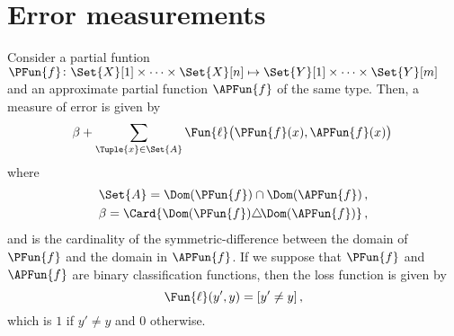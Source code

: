\documentclass[ ../main.tex]{subfiles}
\newcommand{\Loss}{\Fun{\ell}}
\begin{document}
\appendix
\section{Error measurements}
\label{sec:error}
Consider a partial funtion $\PFun{f} \colon \Set{X}[1] \times \cdots \times \Set{X}[n] \mapsto \Set{Y}[1] \times \cdots \times \Set{Y}[m]$ and an approximate partial function $\APFun{f}$ of the same type. Then, a measure of error is given by
\begin{equation}
    \beta + \sum_{\Tuple{x} \in \Set{A}} \Loss\!\left(\PFun{f}(x), \APFun{f}(x)\right)\\
\end{equation}
where
\begin{align}
    \Set{A} = \Dom(\PFun{f}) \cap \Dom(\APFun{f})\,,\\
    \beta = \Card{\Dom(\PFun{f}) \triangle \! \Dom(\APFun{f})}\,,
\end{align}
and is the cardinality of the symmetric-difference between the domain of $\PFun{f}$ and the domain in $\APFun{f}$. If we suppose that $\PFun{f}$ and $\APFun{f}$ are binary classification functions, then the loss function is given by
\begin{equation}
    \Loss(y',y) = [y' \neq y]\,,
\end{equation}
which is $1$ if $y' \neq y$ and $0$ otherwise.
\end{document}
